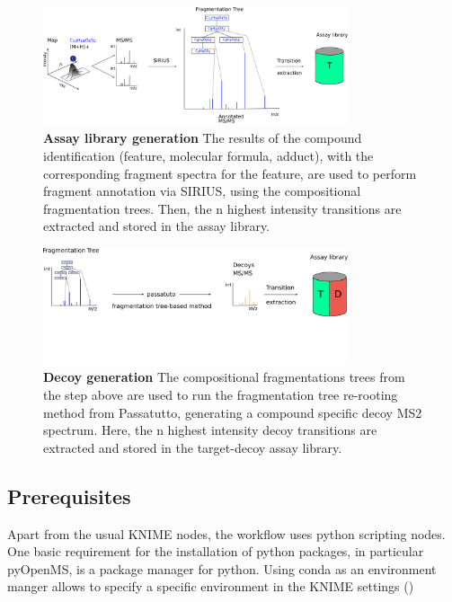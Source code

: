 \begin{figure}[!t]
  \centering
  \includegraphics[width=0.8\textwidth]{graphics/openswathmetabo/assay_library_generation.png}
  \caption{\textbf{Assay library generation}  The results of the compound identification (feature, molecular formula, adduct), with the corresponding fragment spectra  for the feature, are used to perform fragment annotation via SIRIUS, using the compositional fragmentation trees. Then, the n highest intensity transitions are extracted and stored in the assay library.}
  \label{fig:assay_library_generation}
\end{figure}

\begin{figure}[!t]
  \centering
  \includegraphics[width=0.8\textwidth]{graphics/openswathmetabo/decoy_generation.png}
  \caption{\textbf{Decoy generation} The compositional fragmentations trees from the step above are used to run the fragmentation tree re-rooting method from Passatutto, generating a compound specific decoy MS2 spectrum. Here, the n highest intensity decoy transitions are extracted and stored in the target-decoy assay library.}
  \label{fig:decoy_generation}
\end{figure}

\subsection{Prerequisites}
Apart from the usual KNIME nodes, the workflow uses python scripting nodes. One basic requirement for the installation of python packages, in particular pyOpenMS, is a package manager for python. Using conda as an environment manger allows to specify a specific environment in the KNIME settings ()

